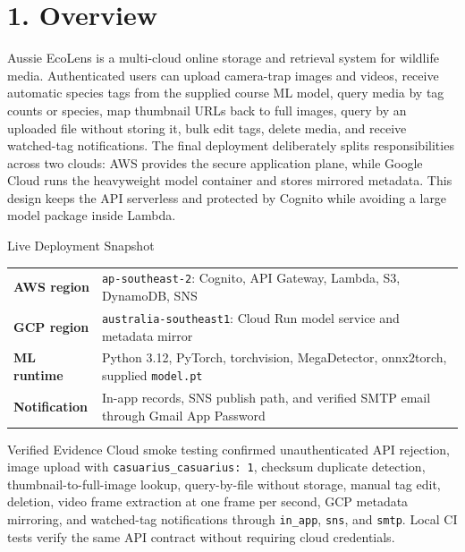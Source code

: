 \documentclass[12pt,a4paper]{article}
\begin{document}
\section*{1. Overview}
Aussie EcoLens is a multi-cloud online storage and retrieval system for wildlife media. Authenticated users can upload camera-trap images and videos, receive automatic species tags from the supplied course ML model, query media by tag counts or species, map thumbnail URLs back to full images, query by an uploaded file without storing it, bulk edit tags, delete media, and receive watched-tag notifications. The final deployment deliberately splits responsibilities across two clouds: AWS provides the secure application plane, while Google Cloud runs the heavyweight model container and stores mirrored metadata. This design keeps the API serverless and protected by Cognito while avoiding a large model package inside Lambda.

\vspace{5mm}
\begin{summarybox}{Live Deployment Snapshot}
\begin{tabularx}{\textwidth}{>{\bfseries}p{31mm}X}
AWS region & \texttt{ap-southeast-2}: Cognito, API Gateway, Lambda, S3, DynamoDB, SNS\\
GCP region & \texttt{australia-southeast1}: Cloud Run model service and metadata mirror\\
ML runtime & Python 3.12, PyTorch, torchvision, MegaDetector, onnx2torch, supplied \texttt{model.pt}\\
Notification & In-app records, SNS publish path, and verified SMTP email through Gmail App Password\\
\end{tabularx}
\end{summarybox}

\vspace{3mm}
\begin{summarybox}{Verified Evidence}
Cloud smoke testing confirmed unauthenticated API rejection, image upload with \texttt{casuarius\_casuarius: 1}, checksum duplicate detection, thumbnail-to-full-image lookup, query-by-file without storage, manual tag edit, deletion, video frame extraction at one frame per second, GCP metadata mirroring, and watched-tag notifications through \texttt{in\_app}, \texttt{sns}, and \texttt{smtp}. Local CI tests verify the same API contract without requiring cloud credentials.
\end{summarybox}
\end{document}
